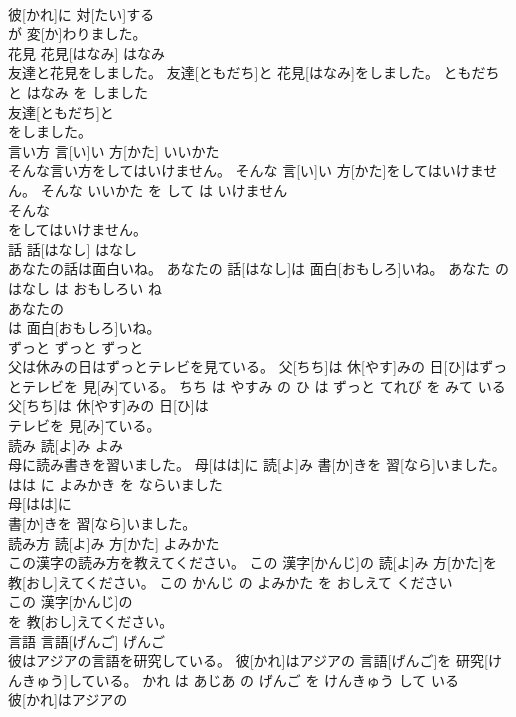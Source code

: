 \documentclass[8pt]{extreport}
\begin{document}
\begin{CJK}{UTF8}{min}
\\	彼[かれ]に 対[たい]する
\\	が 変[か]わりました。			
\\	花見	花見[はなみ]	はなみ	
\\	友達と花見をしました。	友達[ともだち]と 花見[はなみ]をしました。	ともだち と はなみ を しました	
\\	友達[ともだち]と
\\	をしました。			
\\	言い方	言[い]い 方[かた]	いいかた	
\\	そんな言い方をしてはいけません。	そんな 言[い]い 方[かた]をしてはいけません。	そんな いいかた を して は いけません	
\\	そんな
\\	をしてはいけません。			
\\	話	話[はなし]	はなし	
\\	あなたの話は面白いね。	あなたの 話[はなし]は 面白[おもしろ]いね。	あなた の はなし は おもしろい ね	
\\	あなたの
\\	は 面白[おもしろ]いね。			
\\	ずっと	ずっと	ずっと	
\\	父は休みの日はずっとテレビを見ている。	父[ちち]は 休[やす]みの 日[ひ]はずっとテレビを 見[み]ている。	ちち は やすみ の ひ は ずっと てれび を みて いる	
\\	父[ちち]は 休[やす]みの 日[ひ]は
\\	テレビを 見[み]ている。			
\\	読み	読[よ]み	よみ	
\\	母に読み書きを習いました。	母[はは]に 読[よ]み 書[か]きを 習[なら]いました。	はは に よみかき を ならいました	
\\	母[はは]に
\\	書[か]きを 習[なら]いました。			
\\	読み方	読[よ]み 方[かた]	よみかた	
\\	この漢字の読み方を教えてください。	この 漢字[かんじ]の 読[よ]み 方[かた]を 教[おし]えてください。	この かんじ の よみかた を おしえて ください	
\\	この 漢字[かんじ]の
\\	を 教[おし]えてください。			
\\	言語	言語[げんご]	げんご	
\\	彼はアジアの言語を研究している。	彼[かれ]はアジアの 言語[げんご]を 研究[けんきゅう]している。	かれ は あじあ の げんご を けんきゅう して いる	
\\	彼[かれ]はアジアの

\end{CJK}
\end{document}
